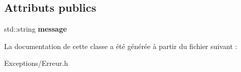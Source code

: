 \subsection*{Attributs publics}
\begin{DoxyCompactItemize}
\item 
\mbox{\label{class_erreur_ab40f3a7406b1c80742c1d8a2744f959b}} 
std\+::string {\bfseries message}
\end{DoxyCompactItemize}


La documentation de cette classe a été générée à partir du fichier suivant \+:\begin{DoxyCompactItemize}
\item 
Exceptions/Erreur.\+h\end{DoxyCompactItemize}
